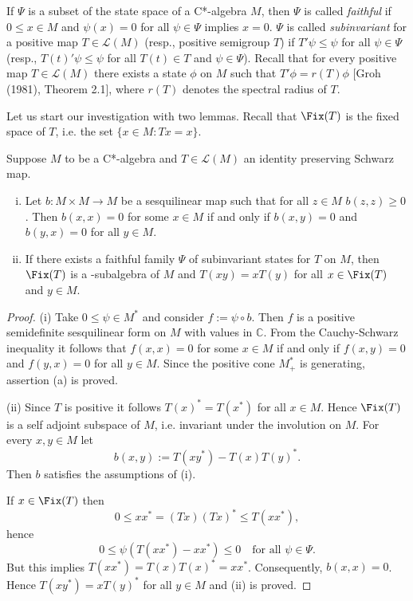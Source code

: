 If $\Psi$ is a subset of the state space of a C*-algebra $M$, then $\Psi$ is called \emph{faithful} if $0 \leq x\in M$ and $\psi(x) = 0$ for all $\psi\in\Psi$ implies $x = 0$.
$\Psi$ is called \emph{subinvariant} for a positive map $T\in\mathcal{L}(M)$ (resp., positive semigroup $T$) if $T'\psi \leq \psi$ for all $\psi\in\Psi$ (resp., $T(t)'\psi \leq \psi$ for all $T(t)\in T$ and $\psi\in\Psi$).
Recall that for every positive map $T\in\mathcal{L}(M)$ there exists a state $\phi$ on $M$ such that $T'\phi = r(T)\phi$ [Groh (1981), Theorem 2.1], where $r(T)$ denotes the spectral radius of $T$.

Let us start our investigation with two lemmas.
Recall that $\Fix(T)$ is the fixed space of $T$, i.e. the set $\{x\in M: Tx=x\}$.


\begin{lemma}\label{lem:1.1}
Suppose $M$ to be a C*-algebra and $T\in\mathcal{L}(M)$ an identity preserving Schwarz map.

\begin{enumerate}[(i)]
\item Let $b: M\times M \to M$ be a sesquilinear map such that for all $z\in M$ $b(z,z) \geq 0$.
Then $b(x,x) = 0$ for some $x\in M$ if and only if $b(x,y) = 0$ and $b(y,x) = 0$ for all $y\in M$.

\item If there exists a faithful family $\Psi$ of subinvariant states for $T$ on $M$, then $\Fix(T)$ is a \CA-subalgebra of $M$ and $T(xy) = xT(y)$ for all $x\in\Fix(T)$ and $y\in M$.

\end{enumerate}
\end{lemma}
\begin{proof} 
(i) Take $0 \leq \psi\in M^*$ and consider $f := \psi\circ b$.
Then $f$ is a positive semidefinite sesquilinear form on $M$ with values in $\mathbb{C}$.
From the Cauchy-Schwarz inequality it follows that $f(x,x) = 0$ for some $x\in M$ if and only if $f(x,y) = 0$ and $f(y,x) = 0$ for all $y\in M$.
Since the positive cone $M^*_{+}$ is generating, assertion (a) is proved.

(ii) Since $T$ is positive it follows $T(x)^* = T(x^*)$ for all $x\in M$.
Hence $\Fix(T)$ is a self adjoint subspace of $M$, i.e. invariant under the involution on $M$.
For every $x,y\in M$ let
\[
	b(x,y) := T(xy^*) - T(x)T(y)^*.
\]
Then $b$ satisfies the assumptions of (i).

If $x\in\Fix(T)$ then
\[
0 \leq xx^* = (Tx)(Tx)^* \leq T(xx^*),
\]
hence
\[
0 \leq \psi(T(xx^*) - xx^*) \leq 0 \quad \text{for all } \psi\in\Psi.
\]
But this implies $T(xx^*) = T(x)T(x)^* = xx^*$.
Consequently, $b(x,x) = 0$.
Hence $T(xy^*) = xT(y)^*$ for all $y\in M$ and (ii) is proved.
\end{proof}

